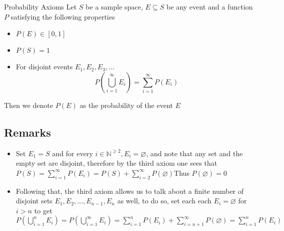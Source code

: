 \documentclass[preview]{standalone}
\begin{document}
\begin{defn*}{Probability Axioms}
Let \(S\) be a sample space, \(E \subseteq S\) be any event and a
function \(P\) satisfying the following properties

\begin{itemize}
\item
  \(P(E) \in [0,1]\)
\item
  \(P(S) = 1\)
\item
  For disjoint events \(E_1, E_2, E_3, \dots\) 
  \[
  P\left( \bigcup_{i=1}^{\infty} E_{i}\right) = \sum_{i=1}^{\infty} P\left(E_{i}\right)
\]
\end{itemize}

Then we denote \(P(E)\) as the probability of the event \(E\)

\subsection*{Remarks}

\begin{itemize}
\item
  Set \(E_{1}= S\) and for every
  \(i \in \mathbb{N} ^{ \ge 2}, E_{i} = \varnothing\), and note that any
  set and the empty set are disjoint, therefore by the third axiom one
  sees that
  \(P\left(S\right)= \sum_{i=1}^{\infty} P\left(E_{i}\right) = P\left(S\right)  +  \sum_{i=2}^{\infty} P\left( \varnothing\right)\)Thus
  \(P\left( \varnothing\right) = 0\)
\item
  Following that, the third axiom allows us to talk about a finite
  number of disjoint sets
  \(E_{1} , E_{2} , \dotsc  , E_{n - 1} , E_{n}\) as well, to do so, set
  each each \(E_{i} = \varnothing\) for \(i > n\) to get
  \(P\left( \bigcup_{i=1}^{n} E_{i}\right) = P\left( \bigcup_{i=1}^{\infty} E_{i}\right)= \sum_{i=1}^{n} P\left(E_{i}\right)  +  \sum_{i=n  +  1}^{\infty} P\left( \varnothing\right) = \sum_{i=1}^{n} P\left(E_{i}\right)\)
\end{itemize}

\end{defn*}
\end{document}
